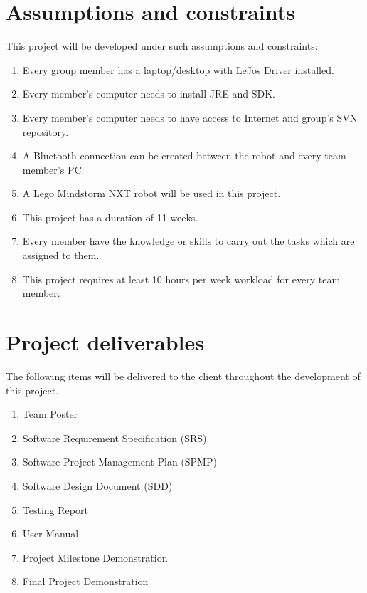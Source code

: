\documentclass[11pt, a4paper]{report}
\begin{document}
\section{Assumptions and constraints}
This project will be developed under such assumptions and constraints:
\begin{enumerate}
	\item Every group member has a laptop/desktop with LeJos Driver installed.
	\item Every member's computer needs to install JRE and SDK.
	\item Every member's computer needs to have access to Internet and group's SVN repository.
	\item A Bluetooth connection can be created between the robot and every team member's PC.
	\item A Lego Mindstorm NXT robot will be used in this project. 
	\item This project has a duration of 11 weeks.
	\item Every member have the knowledge or skills to carry out the tasks which
are assigned to them.
	\item This project requires at least 10 hours per week workload for every team member.
\end{enumerate}

\section{Project deliverables}
The following items will be delivered to the client throughout the development of this project.
\begin{enumerate}
	\item Team Poster
	\item Software Requirement Specification (SRS)
	\item Software Project Management Plan (SPMP)
	\item Software Design Document (SDD)
	\item Testing Report
	\item User Manual
	\item Project Milestone Demonstration
	\item Final Project Demonstration
\end{enumerate}
\end{document}
